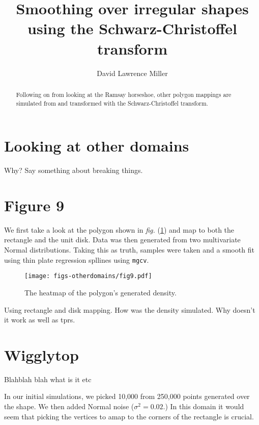 \documentclass[a4paper,10pt]{amsart}
\title{Smoothing over irregular shapes using the Schwarz-Christoffel transform}
\author{David Lawrence Miller}
\newcommand{\sch}{Schwarz-Christoffel }
\newcommand{\fig}[1]{\emph{fig.} (\ref{#1})}
\begin{document}
\begin{abstract}
Following on from looking at the Ramsay horseshoe, other polygon mappings are simulated from and transformed with the \sch transform.
\end{abstract}


\newtheorem{thm}{Theorem}[section]

\newtheorem{defn}{Definition}[section]

\maketitle



\section{Looking at other domains}

Why? Say something about breaking things.


\section{Figure 9}

We first take a look at the polygon shown in \fig{fig9} and map to both the rectangle and the unit disk. Data was then generated from two multivariate Normal distributions. Taking this as truth, samples were taken and a smooth fit using thin plate regression spllines using \texttt{mgcv}.


\begin{figure}
\centering
\texttt{[image: figs-otherdomains/fig9.pdf]} \\
\caption{The heatmap of the polygon's generated density.}
\label{fig9}
\end{figure}




Using rectangle and disk mapping. How was the density simulated. Why doesn't it work as well as tprs.



\section{Wigglytop}


Blahblah blah what is it etc

In our initial simulations, we picked 10,000 from 250,000 points generated over the shape. We then added Normal noise ($\sigma^2=0.02$.) In this domain it would seem that picking the vertices to amap to the corners of the rectangle is crucial.
\end{document}
